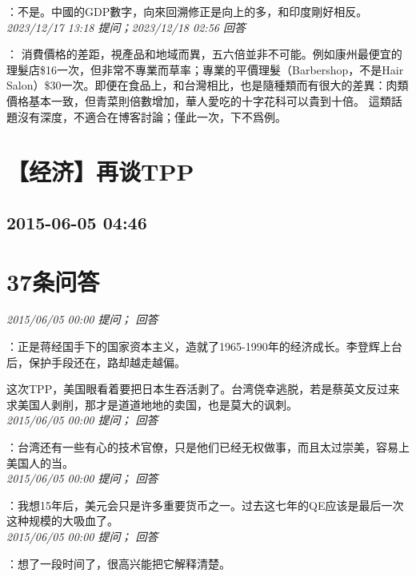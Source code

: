 \documentclass[twocolumn]{ctexart}
\begin{document}
：不是。中國的GDP數字，向來回溯修正是向上的多，和印度剛好相反。
\\

\textit{\hfill\noindent\small 2023/12/17 13:18 提问；2023/12/18 02:56 回答}

：
消費價格的差距，視產品和地域而異，五六倍並非不可能。例如康州最便宜的理髮店\$16一次，但非常不專業而草率；專業的平價理髮（Barbershop，不是Hair Salon）\$30一次。即便在食品上，和台灣相比，也是隨種類而有很大的差異：肉類價格基本一致，但青菜則倍數增加，華人愛吃的十字花科可以貴到十倍。
這類話題沒有深度，不適合在博客討論；僅此一次，下不爲例。
\\


\section{【经济】再谈TPP}
\subsection{2015-06-05 04:46}


\section{37条问答}

\textit{\hfill\noindent\small 2015/06/05 00:00 提问； 回答}

：正是蒋经国手下的国家资本主义，造就了1965-1990年的经济成长。李登辉上台后，保护手段还在，路却越走越偏。

这次TPP，美国眼看着要把日本生吞活剥了。台湾侥幸逃脱，若是蔡英文反过来求美国人剥削，那才是道道地地的卖国，也是莫大的讽刺。\\

\textit{\hfill\noindent\small 2015/06/05 00:00 提问； 回答}

：台湾还有一些有心的技术官僚，只是他们已经无权做事，而且太过崇美，容易上美国人的当。\\

\textit{\hfill\noindent\small 2015/06/05 00:00 提问； 回答}

：我想15年后，美元会只是许多重要货币之一。过去这七年的QE应该是最后一次这种规模的大吸血了。\\

\textit{\hfill\noindent\small 2015/06/05 00:00 提问； 回答}

：想了一段时间了，很高兴能把它解释清楚。\\
\end{document}
